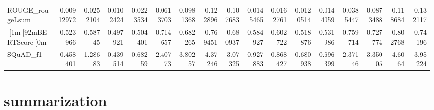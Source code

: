 \begin{tabular}{lrrrrrrrrrrrrrrrr}
 ROUGE_rougeLsum & 0.00912972  & 0.0252104   & 0.0102424  & 0.0223534   & 0.0613703 &  0.0981368 &  0.122896  &  0.107683  & 0.0145465  & 0.0162761   & 0.0120514   & 0.0144059   & 0.0385447 &  0.0873488 &  0.118684  &  0.132117  \\
 [1m[92mBERTScore[0m       & 0.523966    & 0.58745     & 0.497921   & 0.504401    & 0.714657  &  0.682265  &  0.769451  &  0.680937  & 0.584927   & 0.602722    & 0.518876    & 0.531986    & 0.759714  &  0.727774  &  0.802768  &  0.74196   \\
 SQuAD_f1        & 0.458401    & 1.28683     & 0.439514   & 0.68259     & 2.40773   &  3.80257   &  4.37246   &  3.07325   & 0.927883   & 0.868427    & 0.680938    & 0.696399    & 2.37146   &  3.35005   &  4.6064    &  3.95224   \\
\hline
\end{tabular}\section{summarization}
